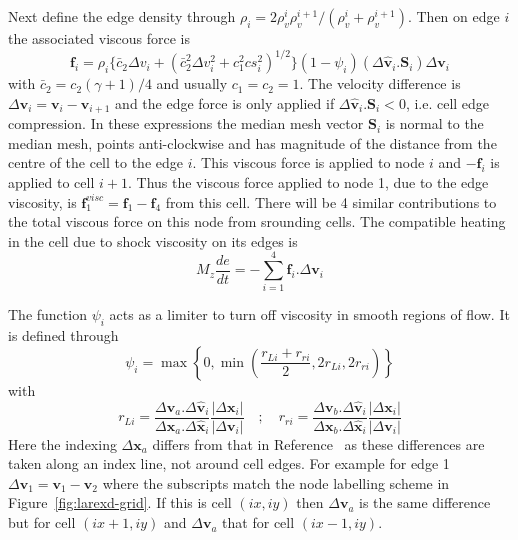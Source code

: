 \documentclass[11pt]{article}
\begin{document}
Next define the edge
density through $\rho_i=2\rho_v^i \rho_v^{i+1} / (\rho_v^i + \rho_v^{i+1})$. Then on
edge $i$ the associated viscous force is
\begin{equation}
  \mathbf{f}_i=\rho_i\{\bar{c}_2 \Delta v_i + (\bar{c}_2^2 \Delta v_i^2 +c_1^2 cs_i^2)^{1/2}\}
  (1-\psi_i)(\Delta \hat{\mathbf{v}}_i . \mathbf{S}_i)\Delta \mathbf{v}_i
\end{equation}
with $\bar{c}_2=c_2 (\gamma+1)/4$ and usually $c_1=c_2=1$. The velocity difference is
$\Delta \mathbf{v}_i=\mathbf{v}_i - \mathbf{v}_{i+1}$ and the edge force is only applied
if $\Delta \hat{\mathbf{v}}_i . \mathbf{S}_i<0$, i.e. cell edge compression. 
In these expressions the median mesh vector $\mathbf{S}_i$ is normal to the median mesh, points anti-clockwise
and has magnitude of the distance from the centre of the cell to the edge $i$.
This viscous force
is applied to node $i$ and $-\mathbf{f}_i$ is applied to cell $i+1$. Thus the viscous force applied
to node 1, due to the edge viscosity, is $\mathbf{f}_1^{visc}=\mathbf{f}_1-\mathbf{f}_4$ from this cell. 
There will be 4 similar contributions to the total viscous force on this node from srounding cells.
The compatible heating
in the cell due to shock viscosity on its edges is
\begin{equation}
  M_z\frac{de}{dt}=-\sum_{i=1}^4\mathbf{f}_i.\Delta \mathbf{v}_i   
\end{equation} 

The function $\psi_i$ acts as a limiter to turn off viscosity in smooth regions of flow. It is defined through
\begin{equation}
  \psi_i=\max\left\{ 0, \min\left( \frac{r_{Li}+r_{ri}}{2},2r_{Li},2r_{ri}\right)\right\}
\end{equation}
with 
\begin{equation}
  r_{Li}=\frac{\Delta \mathbf{v}_{a}. \Delta \hat{\mathbf{v}}_i }{\Delta \mathbf{x}_{a} .\Delta \hat{\mathbf{x}}_i }
  \frac{|\Delta \mathbf{x}_{i}|}{|\Delta \mathbf{v}_{i}|}\quad ;\quad
  r_{ri}=\frac{\Delta \mathbf{v}_{b} .\Delta \hat{\mathbf{v}}_i }{\Delta \mathbf{x}_{b}. \Delta \hat{\mathbf{x}}_i }
  \frac{|\Delta \mathbf{x}_{i}|}{|\Delta \mathbf{v}_{i}|}
\end{equation}
Here the indexing $\Delta \mathbf{x}_{a} $ differs from that in Reference~\cite{caramana} as these differences
are taken along an index line, not around cell edges. For example for edge 1 
$\Delta \mathbf{v}_1 =\mathbf{v}_1-\mathbf{v}_2$ where the 
subscripts match the node labelling scheme in Figure~\ref{fig:larexd-grid}. If this is cell $(ix,iy)$ then 
$\Delta \mathbf{v}_{a} $ is the same difference but for cell $(ix+1,iy)$ and $\Delta \mathbf{v}_{a} $ that for cell
$(ix-1,iy)$. 
\end{document}
